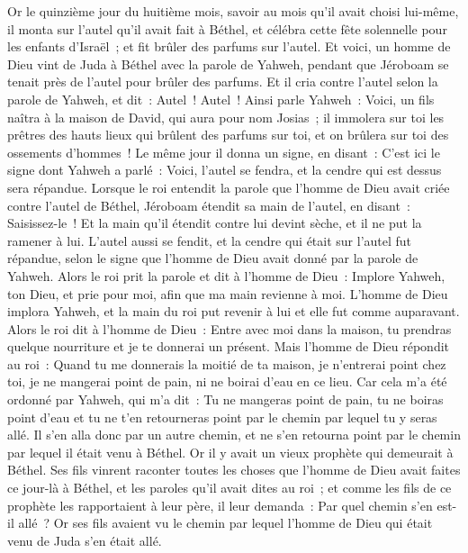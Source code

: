 \begin{multicols}{2}
Or le quinzième jour du huitième mois, savoir au mois qu'il avait choisi lui-même, il monta sur l'autel qu'il avait fait à Béthel, et célébra cette fête solennelle pour les enfants d'Israël~; et fit brûler des parfums sur l'autel.
\VerseOne{}Et voici, un homme de Dieu vint de Juda à Béthel avec la parole de Yahweh, pendant que Jéroboam se tenait près de l'autel pour brûler des parfums.
Et il cria contre l'autel selon la parole de Yahweh, et dit~: Autel~! Autel~! Ainsi parle Yahweh~: Voici, un fils naîtra à la maison de David, qui aura pour nom Josias~; il immolera sur toi les prêtres des hauts lieux qui brûlent des parfums sur toi, et on brûlera sur toi des ossements d'hommes~!
Le même jour il donna un signe, en disant~: C'est ici le signe dont Yahweh a parlé~: Voici, l'autel se fendra, et la cendre qui est dessus sera répandue.
Lorsque le roi entendit la parole que l'homme de Dieu avait criée contre l'autel de Béthel, Jéroboam étendit sa main de l'autel, en disant~: Saisissez-le~! Et la main qu'il étendit contre lui devint sèche, et il ne put la ramener à lui.
L'autel aussi se fendit, et la cendre qui était sur l'autel fut répandue, selon le signe que l'homme de Dieu avait donné par la parole de Yahweh.
Alors le roi prit la parole et dit à l'homme de Dieu~: Implore Yahweh, ton Dieu, et prie pour moi, afin que ma main revienne à moi. L'homme de Dieu implora Yahweh, et la main du roi put revenir à lui et elle fut comme auparavant.
Alors le roi dit à l'homme de Dieu~: Entre avec moi dans la maison, tu prendras quelque nourriture et je te donnerai un présent.
Mais l'homme de Dieu répondit au roi~: Quand tu me donnerais la moitié de ta maison, je n'entrerai point chez toi, je ne mangerai point de pain, ni ne boirai d'eau en ce lieu.
Car cela m'a été ordonné par Yahweh, qui m'a dit~: Tu ne mangeras point de pain, tu ne boiras point d'eau et tu ne t'en retourneras point par le chemin par lequel tu y seras allé.
Il s'en alla donc par un autre chemin, et ne s'en retourna point par le chemin par lequel il était venu à Béthel.
Or il y avait un vieux prophète qui demeurait à Béthel. Ses fils vinrent raconter toutes les choses que l'homme de Dieu avait faites ce jour-là à Béthel, et les paroles qu'il avait dites au roi~; et comme les fils de ce prophète les rapportaient à leur père,
il leur demanda~: Par quel chemin s'en est-il allé~? Or ses fils avaient vu le chemin par lequel l'homme de Dieu qui était venu de Juda s'en était allé.

\end{multicols}
